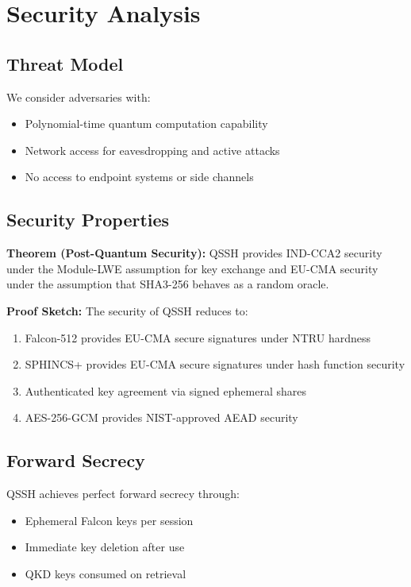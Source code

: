 \documentclass[11pt,a4paper]{article}
\begin{document}
\section{Security Analysis}

\subsection{Threat Model}

We consider adversaries with:
\begin{itemize}
    \item Polynomial-time quantum computation capability
    \item Network access for eavesdropping and active attacks
    \item No access to endpoint systems or side channels
\end{itemize}

\subsection{Security Properties}

\textbf{Theorem (Post-Quantum Security):} QSSH provides IND-CCA2 security under the Module-LWE assumption for key exchange and EU-CMA security under the assumption that SHA3-256 behaves as a random oracle.

\textbf{Proof Sketch:} The security of QSSH reduces to:
\begin{enumerate}
    \item Falcon-512 provides EU-CMA secure signatures under NTRU hardness
    \item SPHINCS+ provides EU-CMA secure signatures under hash function security
    \item Authenticated key agreement via signed ephemeral shares
    \item AES-256-GCM provides NIST-approved AEAD security
\end{enumerate}

\subsection{Forward Secrecy}

QSSH achieves perfect forward secrecy through:
\begin{itemize}
    \item Ephemeral Falcon keys per session
    \item Immediate key deletion after use
    \item QKD keys consumed on retrieval
\end{itemize}
\end{document}
